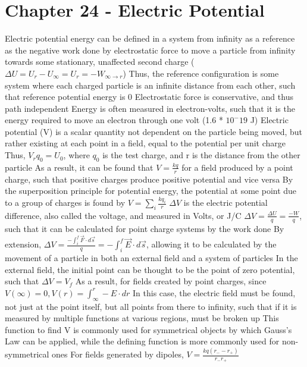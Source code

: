 \documentclass[11 pt, twoside]{article}
\newenvironment{outline*}
{
	\begin{outline}[enumerate]
	}
	{\end{outline}
}
\begin{document}
\section{Chapter 24 - Electric Potential}
\begin{outline*}
\1 Electric potential energy can be defined in a system from infinity as a reference as the negative work done by electrostatic force to move a particle from infinity towards some stationary, unaffected second charge ($\Delta U = U_r - U_\infty = U_r = -W_{\infty \to r}$)
\2 Thus, the reference configuration is some system where each charged particle is an infinite distance from each other, such that reference potential energy is 0
\2 Electrostatic force is conservative, and thus path independent
\2 Energy is often measured in electron-volts, such that it is the energy required to move an electron through one volt (1.6 * $10^-19$ J)
\1 Electric potential (V) is a scalar quantity not dependent on the particle being moved, but rather existing at each point in a field, equal to the potential per unit charge
\2 Thus, $V_rq_0 = U_0$, where $q_0$ is the test charge, and r is the distance from the other particle
\2 As a result, it can be found that $V = \frac{kq}{r}$ for a field produced by a point charge, such that positive charges produce positive potential and vice versa
\3 By the superposition principle for potential energy, the potential at some point due to a group of charges is found by $V = \sum_i \frac{kq_i}{r}$
\1 $\Delta V$ is the electric potential difference, also called the voltage, and measured in Volts, or J/C
\2 $\Delta V = \frac{\Delta U}{q} = \frac{-W}{q}$, such that it can be calculated for point charge systems by the work done
\2 By extension, $\Delta V = \frac{-\int^f_i \vec{F}\cdot d\vec{s}}{q} = -\int^f_i \vec{E} \cdot d\vec{s}$, allowing it to be calculated by the movement of a particle in both an external field and a system of particles
\3 In the external field, the initial point can be thought to be the point of zero potential, such that $\Delta V = V_f$
\3 As a result, for fields created by point charges, since $V(\infty) = 0, V(r) = \int^r_\infty -E \cdot dr$
\4 In this case, the electric field must be found, not just at the point itself, but all points from there to infinity, such that if it is measured by multiple functions at various regions, must be broken up
\4 This function to find V is commonly used for symmetrical objects by which Gauss's Law can be applied, while the defining function is more commonly used for non-symmetrical ones
\2 For fields generated by dipoles, $V = \frac{kq(r_- - r_+)}{r_-r_+}$

\end{outline*}
\end{document}
